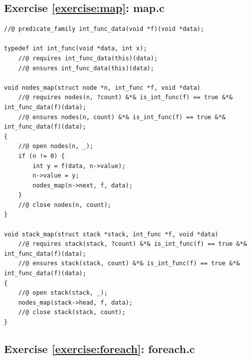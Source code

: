 \documentclass{article}
\begin{document}
\subsection{Exercise \ref{exercise:map}:
map.c}\label{solution:map}

\begin{lstlisting}
//@ predicate_family int_func_data(void *f)(void *data);

typedef int int_func(void *data, int x);
    //@ requires int_func_data(this)(data);
    //@ ensures int_func_data(this)(data);

void nodes_map(struct node *n, int_func *f, void *data)
    //@ requires nodes(n, ?count) &*& is_int_func(f) == true &*& int_func_data(f)(data);
    //@ ensures nodes(n, count) &*& is_int_func(f) == true &*& int_func_data(f)(data);
{
    //@ open nodes(n, _);
    if (n != 0) {
        int y = f(data, n->value);
        n->value = y;
        nodes_map(n->next, f, data);
    }
    //@ close nodes(n, count);
}

void stack_map(struct stack *stack, int_func *f, void *data)
    //@ requires stack(stack, ?count) &*& is_int_func(f) == true &*& int_func_data(f)(data);
    //@ ensures stack(stack, count) &*& is_int_func(f) == true &*& int_func_data(f)(data);
{
    //@ open stack(stack, _);
    nodes_map(stack->head, f, data);
    //@ close stack(stack, count);
}
\end{lstlisting}

\subsection{Exercise \ref{exercise:foreach}:
foreach.c}\label{solution:foreach}
\end{document}
